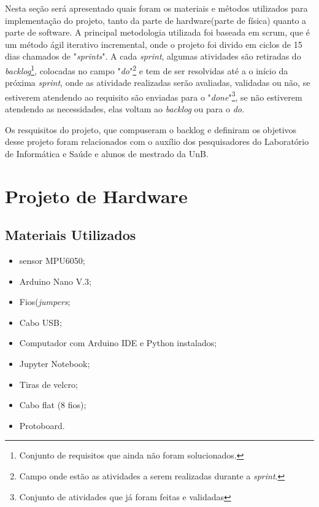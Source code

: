 Nesta seção será apresentado quais foram os materiais e métodos utilizados para implementação do projeto, tanto da parte de hardware(parte de física) quanto a parte de software. A principal metodologia utilizada foi baseada  em scrum, que é um método ágil iterativo incremental, onde o projeto foi divido em ciclos de 15 dias chamados de "\textit{sprints}". A cada \textit{sprint}, algumas atividades são retiradas do \textit{backlog}\footnote{Conjunto de requisitos que ainda não foram solucionados.}, colocadas no campo "\textit{do}"\footnote{Campo onde estão as atividades a serem realizadas durante a \textit{sprint}.}  e tem de ser resolvidas até a o início da próxima \textit{sprint}, onde as atividade realizadas serão avaliadas,  validadas ou não, se estiverem atendendo ao requisito são enviadas para o "\textit{done}"\footnote{Conjunto de atividades que já foram feitas e validadas}, se não estiverem atendendo as necessidades, elas voltam ao \textit{backlog} ou para o \textit{do}.

Os resquisitos do projeto, que compuseram o backlog e definiram os objetivos desse projeto foram relacionados com o auxílio dos pesquisadores do Laboratório de Informática e Saúde e alunos de mestrado da UnB.

\section{Projeto de Hardware}


 
	\subsection{Materiais Utilizados}
		\begin{itemize}
			
			\item sensor MPU6050;
			\item Arduino Nano V.3;
			\item Fios(\textit{jumpers};
			\item Cabo USB;
			\item Computador com Arduino IDE e Python instalados;
			\item Jupyter Notebook;
			\item Tiras de velcro;
			\item Cabo flat (8 fios);
			\item Protoboard.
			
		\end{itemize}	
	 
